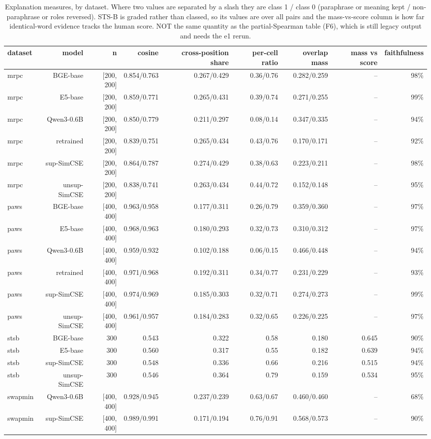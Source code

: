 \begin{table}[t]
\centering
\small
\caption{Explanation measures, by dataset. Where two values are separated by a slash they are class 1 / class 0 (paraphrase or meaning kept / non-paraphrase or roles reversed). STS-B is graded rather than classed, so its values are over all pairs and the mass-vs-score column is how far identical-word evidence tracks the human score. NOT the same quantity as the partial-Spearman table (F6), which is still legacy output and needs the e1 rerun.}
\begin{tabular}{lrrrrrrrr}
\toprule
dataset & model & n & cosine & cross-position share & per-cell ratio & overlap mass & mass vs score & faithfulness \\
\midrule
mrpc & BGE-base & [200, 200] & 0.854/0.763 & 0.267/0.429 & 0.36/0.76 & 0.282/0.259 & -- & 98\% \\
mrpc & E5-base & [200, 200] & 0.859/0.771 & 0.265/0.431 & 0.39/0.74 & 0.271/0.255 & -- & 99\% \\
mrpc & Qwen3-0.6B & [200, 200] & 0.850/0.779 & 0.211/0.297 & 0.08/0.14 & 0.347/0.335 & -- & 94\% \\
mrpc & retrained & [200, 200] & 0.839/0.751 & 0.265/0.434 & 0.43/0.76 & 0.170/0.171 & -- & 92\% \\
mrpc & sup-SimCSE & [200, 200] & 0.864/0.787 & 0.274/0.429 & 0.38/0.63 & 0.223/0.211 & -- & 98\% \\
mrpc & unsup-SimCSE & [200, 200] & 0.838/0.741 & 0.263/0.434 & 0.44/0.72 & 0.152/0.148 & -- & 95\% \\
paws & BGE-base & [400, 400] & 0.963/0.958 & 0.177/0.311 & 0.26/0.79 & 0.359/0.360 & -- & 97\% \\
paws & E5-base & [400, 400] & 0.968/0.963 & 0.180/0.293 & 0.32/0.73 & 0.310/0.312 & -- & 97\% \\
paws & Qwen3-0.6B & [400, 400] & 0.959/0.932 & 0.102/0.188 & 0.06/0.15 & 0.466/0.448 & -- & 94\% \\
paws & retrained & [400, 400] & 0.971/0.968 & 0.192/0.311 & 0.34/0.77 & 0.231/0.229 & -- & 93\% \\
paws & sup-SimCSE & [400, 400] & 0.974/0.969 & 0.185/0.303 & 0.32/0.71 & 0.274/0.273 & -- & 99\% \\
paws & unsup-SimCSE & [400, 400] & 0.961/0.957 & 0.184/0.283 & 0.32/0.65 & 0.226/0.225 & -- & 97\% \\
stsb & BGE-base & 300 & 0.543 & 0.322 & 0.58 & 0.180 & 0.645 & 90\% \\
stsb & E5-base & 300 & 0.560 & 0.317 & 0.55 & 0.182 & 0.639 & 94\% \\
stsb & sup-SimCSE & 300 & 0.548 & 0.336 & 0.66 & 0.216 & 0.515 & 94\% \\
stsb & unsup-SimCSE & 300 & 0.546 & 0.364 & 0.79 & 0.159 & 0.534 & 95\% \\
swapmin & Qwen3-0.6B & [400, 400] & 0.928/0.945 & 0.237/0.239 & 0.63/0.67 & 0.460/0.460 & -- & 68\% \\
swapmin & sup-SimCSE & [400, 400] & 0.989/0.991 & 0.171/0.194 & 0.76/0.91 & 0.568/0.573 & -- & 90\% \\
\bottomrule
\end{tabular}
\end{table}
